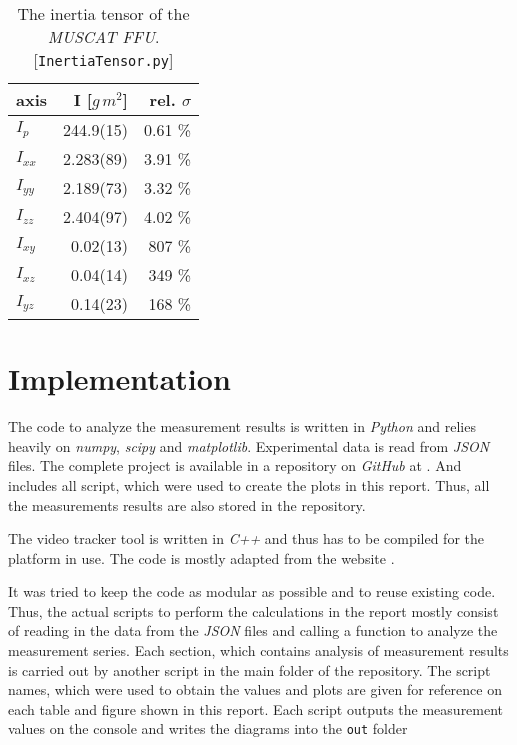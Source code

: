 \documentclass[journal]{IEEEtran}
\begin{document}
\begin{table}
	\centering
	\begin{tabular}{l | r r}
		axis	& I [$\unit{g\,m^2}$]		& rel. $\sigma$ \\
		\hline
		$I_p$		& 244.9(15)	& 0.61 \% \\
		$I_{xx}$	&	2.283(89)	& 3.91 \% \\
		$I_{yy}$	&	2.189(73)	& 3.32 \% \\
		$I_{zz}$	&	2.404(97)	& 4.02 \% \\
		$I_{xy}$	&	0.02(13)	& 807 \% \\
		$I_{xz}$	&	0.04(14)	& 349 \% \\
		$I_{yz}$	&	0.14(23)	& 168 \% \\
	\end{tabular}
	\caption{The inertia tensor of the \emph{MUSCAT FFU}. [\texttt{InertiaTensor.py}]}
	\label{tab:FFUInertiaTensor}
\end{table}

\section{Implementation}

The code to analyze the measurement results is written in \emph{Python} and relies heavily on \emph{numpy}, \emph{scipy} and \emph{matplotlib}.
Experimental data is read from \emph{JSON} files.
The complete project is available in a repository on \emph{GitHub} at \cite{website:github}.
And includes all script, which were used to create the plots in this report.
Thus, all the measurements results are also stored in the repository. 

The video tracker tool is written in \emph{C++} and thus has to be compiled for the platform in use. The code is mostly adapted from the website \cite{website:opencv}.

It was tried to keep the code as modular as possible and to reuse existing code. Thus, the actual scripts to perform the calculations in the report mostly consist of reading in the data from the \emph{JSON} files and calling a function to analyze the measurement series.
Each section, which contains analysis of measurement results is carried out by another script in the main folder of the repository. The script names, which were used to obtain the values and plots are given for reference on each table and figure shown in this report.
Each script outputs the measurement values on the console and writes the diagrams into the \texttt{out} folder 
\end{document}
